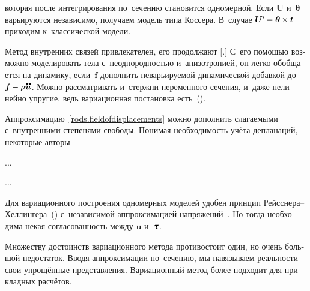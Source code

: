 \begin{otherlanguage}{russian}
\vspace{-0.1em}\noindent
которая после интегрирования по~сечению становится одномерной.
Если $\bm{U}$ и~$\bm{\theta}$ варьируются независимо, получаем модель типа Коссера.
В~случае $\bm{U}' \hspace{-0.25ex} = \bm{\theta} \hspace{-0.1ex} \times \bm{t}$ приходим к~классической модели.

Метод внутренних связей привлекателен, его продолжают [.]
С~его помощью возможно моделировать тела с~неоднородностью и~анизотропией, он легко обобщается на динамику, если~$\bm{f}$ дополнить неварьируемой динамической добавкой до~${\bm{f} \hspace{-0.1ex} - \rho \hspace{.1ex} \mathdotdotabove{\bm{u}}}$.
Можно рассматривать и~стержни переменного сечения, и~даже нелинейно упругие, ведь вариационная постановка есть~().

Аппроксимацию~\eqref{rods.fieldofdisplacements} можно дополнить слагаемыми с~внутренними степенями свободы.
Понимая необходимость учёта депланаций, некоторые авторы

...

...



Для вариационного построения одномерных моделей удобен принцип Рейсснера\hbox{--}Хеллингера~() с~независимой аппроксимацией напряжений~\cite{eliseev-models}.
Но тогда необходима некая согласованность между $\bm{u}$ и~$\cauchystress$.

Множеству достоинств вариационного метода противостоит один, но очень большой недостаток.
Вводя аппроксимации по~сечению, мы навязываем реальности свои упрощённые представления.
Вариационный метод более подходит для прикладных расчётов.

\end{otherlanguage}



